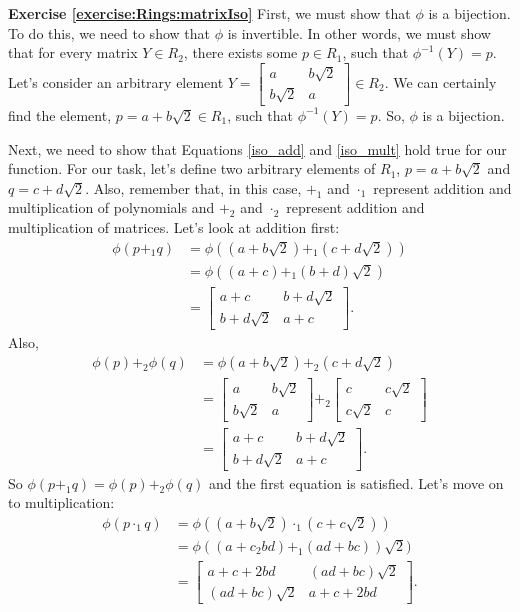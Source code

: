 \noindent\textbf{Exercise \ref{exercise:Rings:matrixIso}}
First, we must show that $\phi$ is a bijection.  To do this, we need to show that $\phi$ is invertible.  In other words, we must show that for every matrix $Y\in R_2$, there exists some $p\in R_1$, such that $\phi^{-1}(Y)=p$.  Let's consider an arbitrary element $Y=
\begin{bmatrix}
a & b \sqrt{2}\\
b \sqrt{2} & a
\end{bmatrix}
\in R_2$.  We can certainly find the element, $p=a+b\sqrt{2}\in R_1$, such that $\phi^{-1}(Y)=p$.  So, $\phi$ is a bijection.

Next, we need to show that Equations \eqref{iso_add} and \ref{iso_mult} hold true for our function.  For our task, let's define two arbitrary elements of $R_1$, $p=a+b\sqrt{2}$ and $q=c+d\sqrt{2}$. Also, remember that, in this case, $+_1$ and $\cdot_1$ represent addition and multiplication of polynomials and $+_2$ and $\cdot_2$ represent addition and multiplication of matrices.  Let's look at addition first:
\begin{align*}
\phi(p+_1q)&=\phi((a+b\sqrt{2})+_1(c+d\sqrt{2}))\\
&=\phi((a+c)+_1(b+d)\sqrt{2})\\
&=
\begin{bmatrix}
a+c & b+d \sqrt{2}\\
b+d \sqrt{2} & a+c
\end{bmatrix}.
\end{align*}
Also,
\begin{align*}
\phi(p)+_2\phi(q)&=\phi(a+b\sqrt{2})+_2(c+d\sqrt{2})\\
&=
\begin{bmatrix}
a & b \sqrt{2}\\
b \sqrt{2} & a
\end{bmatrix} +_2
\begin{bmatrix}
c & c \sqrt{2}\\
c \sqrt{2} & c
\end{bmatrix}\\
&=
\begin{bmatrix}
a+c & b+d \sqrt{2}\\
b+d \sqrt{2} & a+c
\end{bmatrix}.
\end{align*}
So $\phi(p+_1q)=\phi(p)+_2\phi(q)$ and the first equation is satisfied.  Let's move on to multiplication:
\begin{align*}
\phi(p\cdot_1q)&=\phi((a+b\sqrt{2})\cdot_1(c+c\sqrt{2}))\\
&=\phi((a+c_2bd)+_1(ad+bc))\sqrt{2})\\
&=
\begin{bmatrix}
a+c+2bd & (ad+bc) \sqrt{2}\\
(ad+bc) \sqrt{2} & a+c+2bd
\end{bmatrix}.
\end{align*}
